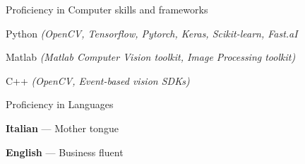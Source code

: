 


\begin{cventries}

 
  \cventry
    {Proficiency in} %
    {Computer skills and frameworks} %
    {} %
    {} %
    {
      \begin{cvitems} %
	\item Python \textit{(OpenCV, Tensorflow, Pytorch, Keras, Scikit-learn, Fast.aI}
	\item Matlab \textit{(Matlab Computer Vision toolkit, Image Processing toolkit)}
	\item C++ \textit{(OpenCV, Event-based vision SDKs)}
	\end{cvitems}
	}
	
  \cventry
    {Proficiency in} %
    {Languages} %
    {} %
    {} %
    {
      \begin{cvitems} %
	\item \textbf{Italian} --- {Mother tongue}
	\item \textbf{English} --- {Business fluent}
	\end{cvitems}
	}
	
	

\end{cventries}
